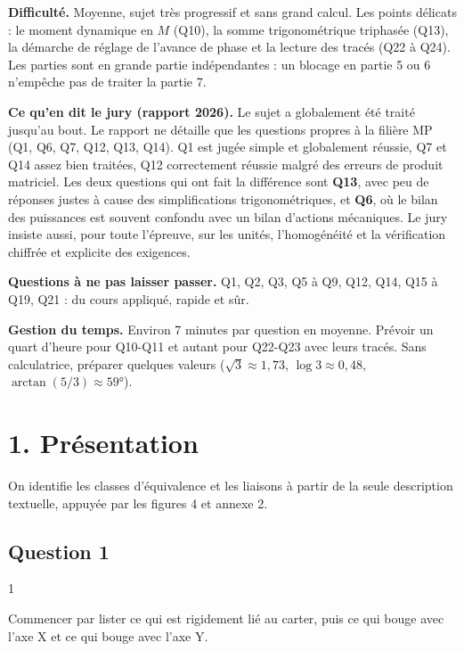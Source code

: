 \documentclass[11pt,a4paper]{article}
\begin{document}
\textbf{Difficulté.} Moyenne, sujet très progressif et sans grand calcul. Les points délicats : le moment dynamique en \(M\) (Q10), la somme trigonométrique triphasée (Q13), la démarche de réglage de l'avance de phase et la lecture des tracés (Q22 à Q24). Les parties sont en grande partie indépendantes : un blocage en partie 5 ou 6 n'empêche pas de traiter la partie 7.

\textbf{Ce qu'en dit le jury (rapport 2026).} Le sujet a globalement été traité jusqu'au bout. Le rapport ne détaille que les questions propres à la filière MP (Q1, Q6, Q7, Q12, Q13, Q14). Q1 est jugée simple et globalement réussie, Q7 et Q14 assez bien traitées, Q12 correctement réussie malgré des erreurs de produit matriciel. Les deux questions qui ont fait la différence sont \textbf{Q13}, avec peu de réponses justes à cause des simplifications trigonométriques, et \textbf{Q6}, où le bilan des puissances est souvent confondu avec un bilan d'actions mécaniques. Le jury insiste aussi, pour toute l'épreuve, sur les unités, l'homogénéité et la vérification chiffrée et explicite des exigences.

\textbf{Questions à ne pas laisser passer.} Q1, Q2, Q3, Q5 à Q9, Q12, Q14, Q15 à Q19, Q21 : du cours appliqué, rapide et sûr.

\textbf{Gestion du temps.} Environ 7 minutes par question en moyenne. Prévoir un quart d'heure pour Q10-Q11 et autant pour Q22-Q23 avec leurs tracés. Sans calculatrice, préparer quelques valeurs (\(\sqrt3\approx1{,}73\), \(\log3\approx0{,}48\), \(\arctan(5/3)\approx59°\)).

\hypertarget{pruxe9sentation}{%
\section{1. Présentation}\label{pruxe9sentation}}

On identifie les classes d'équivalence et les liaisons à partir de la seule description textuelle, appuyée par les figures 4 et annexe 2.

\hypertarget{question-1}{%
\subsection{Question 1}\label{question-1}}

\begin{indication}{1}

Commencer par lister ce qui est rigidement lié au carter, puis ce qui bouge avec l'axe X et ce qui bouge avec l'axe Y.

\end{indication}
\end{document}
